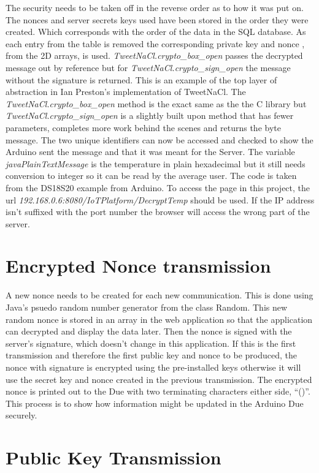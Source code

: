 The security needs to be taken off in the reverse order as to how it was put on. The nonces and server secrets keys used have been stored in the order they were created. Which corresponds with the order of the data in the SQL database. As each entry from the table is removed the corresponding private key and nonce , from the 2D arrays, is used. \emph{TweetNaCl.crypto\_box\_open} passes the decrypted message out by reference but for \emph{TweetNaCl.crypto\_sign\_open} the message without the signature is returned. This is an example of the top layer of abstraction in Ian Preston's implementation of TweetNaCl. The  \emph{TweetNaCl.crypto\_box\_open} method is the exact same as the the C library but \emph{TweetNaCl.crypto\_sign\_open} is a slightly built upon method that has fewer parameters, completes more work behind the scenes and returns the byte message. The two unique identifiers can now be accessed and checked to show the Arduino sent the message and that it was meant for the Server. The variable \emph{javaPlainTextMessage} is the temperature in plain hexadecimal but it still needs conversion to integer so it can be read by the average user. The code is taken from the DS18S20 example from Arduino\cite{onewire}. To access the page in this project, the url \emph{192.168.0.6:8080/IoTPlatform/DecryptTemp} should be used. If the IP address isn't suffixed with the port number the browser will access the wrong part of the server.

\section{Encrypted Nonce transmission}
\label{nonce}
A new nonce needs to be created for each new communication. This is done using Java's psuedo random number generator from the class Random. This new random nonce is stored in an array in the web application so that the application can decrypted and display the data later. Then the nonce is signed with the server's signature, which doesn't change in this application. If this is the first transmission and therefore the first public key and nonce to be produced, the nonce with signature is encrypted using the pre-installed keys otherwise it will use the secret key and nonce created in the previous transmission. The encrypted nonce is printed out to the Due with two terminating characters either side, ``()''. This process is to show how information might be updated in the Arduino Due securely.

\section{Public Key Transmission}
\label{pktransmit}

